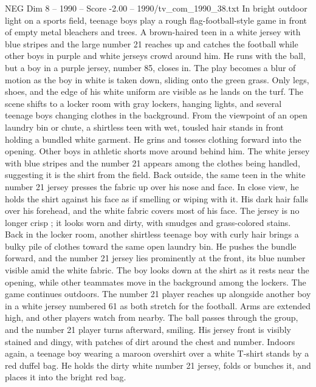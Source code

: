 \begin{textsample}{NEG Dim 8 – 1990 – Score -2.00 – 1990/tv\_com\_1990\_38.txt}  \label{ex:f8_neg_040}
In bright outdoor light on a sports field, teenage boys play a rough flag-football-style game in front of empty metal bleachers and trees.
A brown-haired teen in a white jersey with blue stripes and the large number 21 reaches up and catches the football while other boys in purple and white jerseys crowd around him.
He runs with the ball, but a boy in a purple jersey, number 85, closes in.
The play becomes a blur of motion as the boy in white is taken down, sliding onto the green grass.
Only legs, shoes, and the edge of his white uniform are visible as he lands on the turf.
The scene shifts to a locker room with gray lockers, hanging lights, and several teenage boys changing clothes in the background.
From the viewpoint of an open laundry bin or chute, a shirtless teen with wet, tousled hair stands in front holding a bundled white garment.
He grins and tosses clothing forward into the opening.
Other boys in athletic shorts move around behind him.
The white jersey with blue stripes and the number 21 appears among the clothes being handled, suggesting it is the shirt from the field.
Back outside, the same teen in the white number 21 jersey presses the fabric up over his nose and face.
In close view, he holds the shirt against his face as if smelling or wiping with it.
His dark hair falls over his forehead, and the white fabric covers most of his face.
The jersey is no longer crisp ; it looks worn and dirty, with smudges and grass-colored stains.
Back in the locker room, another shirtless teenage boy with curly hair brings a bulky pile of clothes toward the same open laundry bin.
He pushes the bundle forward, and the number 21 jersey lies prominently at the front, its blue number visible amid the white fabric.
The boy looks down at the shirt as it rests near the opening, while other teammates move in the background among the lockers.
The game continues outdoors.
The number 21 player reaches up alongside another boy in a white jersey numbered 61 as both stretch for the football.
Arms are extended high, and other players watch from nearby.
The ball passes through the group, and the number 21 player turns afterward, smiling.
His jersey front is visibly stained and dingy, with patches of dirt around the chest and number.
Indoors again, a teenage boy wearing a maroon overshirt over a white T-shirt stands by a red duffel bag.
He holds the dirty white number 21 jersey, folds or bunches it, and places it into the bright red bag.

\end{textsample}
